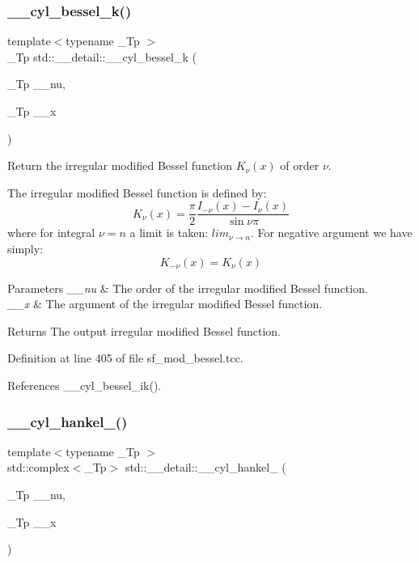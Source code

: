 \subsubsection{\texorpdfstring{\+\_\+\+\_\+cyl\+\_\+bessel\+\_\+k()}{\_\_cyl\_bessel\_k()}}
{\footnotesize\ttfamily template$<$typename \+\_\+\+Tp $>$ \\
\+\_\+\+Tp std\+::\+\_\+\+\_\+detail\+::\+\_\+\+\_\+cyl\+\_\+bessel\+\_\+k (\begin{DoxyParamCaption}\item[{\+\_\+\+Tp}]{\+\_\+\+\_\+nu,  }\item[{\+\_\+\+Tp}]{\+\_\+\+\_\+x }\end{DoxyParamCaption})}



Return the irregular modified Bessel function $ K_{\nu}(x) $ of order $ \nu $. 

The irregular modified Bessel function is defined by\+: \[ K_{\nu}(x) = \frac{\pi}{2} \frac{I_{-\nu}(x) - I_{\nu}(x)}{\sin \nu\pi} \] where for integral $ \nu = n $ a limit is taken\+: $ lim_{\nu \to n} $. For negative argument we have simply\+: \[ K_{-\nu}(x) = K_{\nu}(x) \]


\begin{DoxyParams}{Parameters}
{\em \+\_\+\+\_\+nu} & The order of the irregular modified Bessel function. \\
\hline
{\em \+\_\+\+\_\+x} & The argument of the irregular modified Bessel function. \\
\hline
\end{DoxyParams}
\begin{DoxyReturn}{Returns}
The output irregular modified Bessel function. 
\end{DoxyReturn}


Definition at line 405 of file sf\+\_\+mod\+\_\+bessel.\+tcc.



References \+\_\+\+\_\+cyl\+\_\+bessel\+\_\+ik().

\mbox{\label{namespacestd_1_1____detail_aac3fc60c1210e8f2ae3cf05cdc7bad84}} 
\subsubsection{\texorpdfstring{\+\_\+\+\_\+cyl\+\_\+hankel\+\_()}{\_\_cyl\_hankel\_1()}\hspace{0.1cm}{\footnotesize\ttfamily [1/2]}}
{\footnotesize\ttfamily template$<$typename \+\_\+\+Tp $>$ \\
std\+::complex$<$\+\_\+\+Tp$>$ std\+::\+\_\+\+\_\+detail\+::\+\_\+\+\_\+cyl\+\_\+hankel\+\_ (\begin{DoxyParamCaption}\item[{\+\_\+\+Tp}]{\+\_\+\+\_\+nu,  }\item[{\+\_\+\+Tp}]{\+\_\+\+\_\+x }\end{DoxyParamCaption})}



